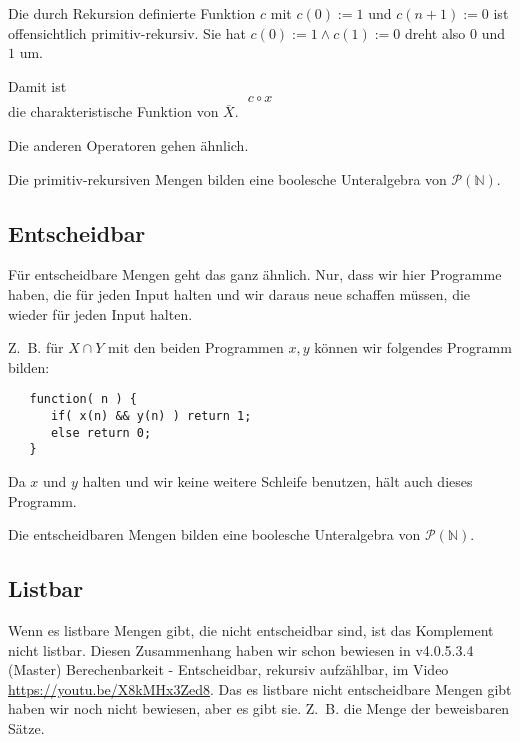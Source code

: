 \documentclass[a4paper]{amsart}
\theoremstyle{definition}
\newcommand{\N}{\ensuremath{\mathbb{ N }}}
\newcommand{\PP}{\ensuremath{\mathcal{ P }}}
\begin{document}
Die durch Rekursion definierte Funktion $c$ mit $c(0) := 1$ und $c(n+1) := 0$ ist offensichtlich primitiv-rekursiv. Sie hat $c(0) := 1 \land c(1) := 0$ dreht also $0$ und $1$ um.

Damit ist
\begin{equation}\label{pKomplement}
   c\circ x
\end{equation}
die charakteristische Funktion von $\overline X$.

Die anderen Operatoren gehen ähnlich.

{\color{red}Die primitiv-rekursiven Mengen bilden eine boolesche Unteralgebra von $\PP(\N)$.} 

\subsection{Entscheidbar}
Für entscheidbare Mengen geht das ganz ähnlich. Nur, dass wir hier Programme haben, die für jeden Input halten und wir daraus neue schaffen müssen, die wieder für jeden Input halten.

Z.~B. für $X \cap Y$ mit den beiden Programmen $x,y$ können wir folgendes Programm bilden:
\begin{lstlisting}
   function( n ) {
      if( x(n) && y(n) ) return 1;
      else return 0;
   }
\end{lstlisting}
Da $x$ und $y$ halten und wir keine weitere Schleife benutzen, hält auch dieses Programm.

{\color{red}Die entscheidbaren Mengen bilden eine boolesche Unteralgebra von $\PP(\N)$.} 

\subsection{Listbar}
Wenn es listbare Mengen gibt, die nicht entscheidbar sind, ist das Komplement nicht listbar. Diesen Zusammenhang haben wir schon bewiesen in v4.0.5.3.4 (Master) Berechenbarkeit - Entscheidbar, rekursiv aufzählbar, im Video \url{https://youtu.be/X8kMHx3Zed8}. Das es listbare nicht entscheidbare Mengen gibt haben wir noch nicht bewiesen, aber es gibt sie. Z.~B. die Menge der beweisbaren Sätze.
\end{document}
